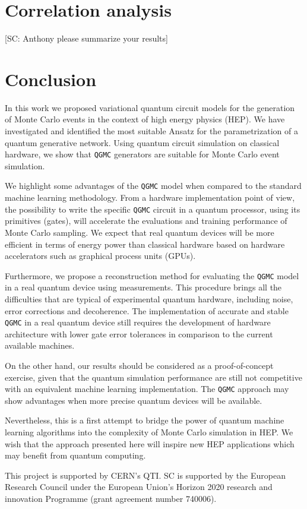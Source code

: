 \documentclass[twocolumn,preprintnumbers,superscriptaddress]{revtex4-2}
\begin{document}
\section{Correlation analysis}

{\color{red}[SC: Anthony please summarize your results]}

\section{Conclusion}
\label{sec:conclusion}

In this work we proposed variational quantum circuit models for the generation
of Monte Carlo events in the context of high energy physics (HEP). We have
investigated and identified the most suitable Ansatz for the parametrization of
a quantum generative network. Using quantum circuit simulation on classical
hardware, we show that {\tt QGMC} generators are suitable for Monte Carlo event
simulation.

We highlight some advantages of the {\tt QGMC} model when compared to the standard
machine learning methodology. From a hardware implementation point of view, the
possibility to write the specific {\tt QGMC} circuit in a quantum processor, using
its primitives (gates), will accelerate the evaluations and training performance
of Monte Carlo sampling. We expect that real quantum devices will be more
efficient in terms of energy power than classical hardware based on hardware
accelerators such as graphical process units (GPUs).

Furthermore, we propose a reconstruction method for evaluating the {\tt QGMC}
model in a real quantum device using measurements. This procedure brings all the
difficulties that are typical of experimental quantum hardware, including noise,
error corrections and decoherence. The implementation of accurate and stable
{\tt QGMC} in a real quantum device still requires the development of hardware
architecture with lower gate error tolerances in comparison to the current
available machines.

On the other hand, our results should be considered as a proof-of-concept
exercise, given that the quantum simulation performance are still not
competitive with an equivalent machine learning implementation. The {\tt QGMC}
approach may show advantages when more precise quantum devices will be
available.

Nevertheless, this is a first attempt to bridge the power of quantum machine
learning algorithms into the complexity of Monte Carlo simulation in HEP. We
wish that the approach presented here will inspire new HEP applications which
may benefit from quantum computing.

\acknowledgments

This project is supported by CERN's QTI. SC is supported by the European
Research Council under the European Union's Horizon 2020 research and innovation
Programme (grant agreement number 740006).


\end{document}
